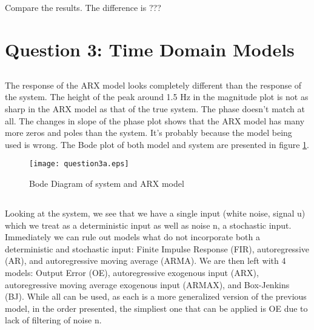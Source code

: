 \documentclass[times,12pt,reqno]{amsart}
\begin{document}
\subsection{}

Compare the results. The difference is ???

\newpage
\section{Question 3: Time Domain Models}

\subsection{}
The response of the ARX model looks completely different than the response of
the system. The height of the peak around 1.5 Hz in the magnitude plot is not
as sharp in the ARX model as that of the true system. The phase doesn't match
at all. The changes in slope of the phase plot shows that the ARX model has
many more zeros and poles than the system. It's probably because the model
being used is wrong. The Bode plot of both model and system are presented in
figure \ref{fig:q3a}.
\begin{figure}[H]
    \begin{center}
        \texttt{[image: question3a.eps]}
    \end{center}
    \caption{Bode Diagram of system and ARX model}
    \label{fig:q3a}
\end{figure}

\subsection{}
Looking at the system, we see that we have a single input (white noise,
signal u) which we treat as a deterministic input as well as noise n, a
stochastic input. Immediately we can rule out models what do not incorporate
both a deterministic and stochastic input: Finite Impulse Response (FIR),
autoregressive (AR), and autoregressive moving average (ARMA). We are then left
with 4 models: Output Error (OE), autoregressive exogenous input (ARX),
autoregressive moving average exogenous input (ARMAX), and Box-Jenkins (BJ).
While all can be used, as each is a more generalized version of the previous
model, in the order presented, the simpliest one that can be applied is OE due
to lack of filtering of noise n.

\subsection{}
\end{document}
